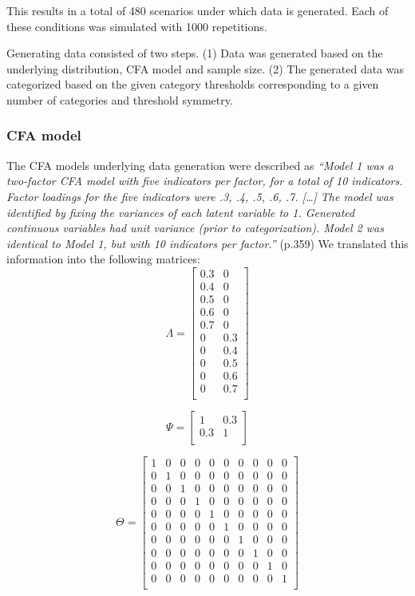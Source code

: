 \documentclass[10,a4paperpaper,]{article}
\begin{document}
This results in a total of 480 scenarios under which data is generated.
Each of these conditions was simulated with 1000 repetitions.

Generating data consisted of two steps. (1) Data was generated based on
the underlying distribution, CFA model and sample size. (2) The
generated data was categorized based on the given category thresholds
corresponding to a given number of categories and threshold symmetry.

\subsubsection{CFA model}

The CFA models underlying data generation were described as
\emph{``Model 1 was a two-factor CFA model with five indicators per
factor, for a total of 10 indicators. Factor loadings for the five
indicators were .3, .4, .5, .6, .7. {[}\ldots{]} The model was
identified by fixing the variances of each latent variable to 1.
Generated continuous variables had unit variance (prior to
categorization). Model 2 was identical to Model 1, but with 10
indicators per factor.''} (p.359) We translated this information into
the following matrices: \[
\Lambda = 
  \left[ {\begin{array}{cc}
    0.3 & 0 \\
    0.4 & 0\\
    0.5 & 0\\
    0.6 & 0\\
    0.7 & 0\\
    0 & 0.3\\
    0 & 0.4\\
    0 & 0.5\\
    0 & 0.6\\
    0 & 0.7\\
  \end{array} } \right]\]

\[ 
\Psi = 
  \left[ {\begin{array}{cc}
    1 & 0.3 \\
    0.3 & 1\\
  \end{array} } \right]
\]

\[ 
\Theta = 
  \left[ {\begin{array}{cccccccccc}
    1 & 0 & 0 & 0 & 0 & 0 & 0 & 0 & 0 & 0 \\
    0 & 1 & 0 & 0 & 0 & 0 & 0 & 0 & 0 & 0\\
    0 & 0 & 1 & 0 & 0 & 0 & 0 & 0 & 0 & 0 \\
    0 & 0 & 0 & 1 & 0 & 0 & 0 & 0 & 0 & 0\\
    0 & 0 & 0 & 0 & 1 & 0 & 0 & 0 & 0 & 0 \\
    0 & 0 & 0 & 0 & 0 & 1 & 0 & 0 & 0 & 0\\
    0 & 0 & 0 & 0 & 0 & 0 & 1 & 0 & 0 & 0 \\
    0 & 0 & 0 & 0 & 0 & 0 & 0 & 1 & 0 & 0\\
    0 & 0 & 0 & 0 & 0 & 0 & 0 & 0 & 1 & 0 \\
    0 & 0 & 0 & 0 & 0 & 0 & 0 & 0 & 0 & 1\\
  \end{array} } \right]
\]
\end{document}
